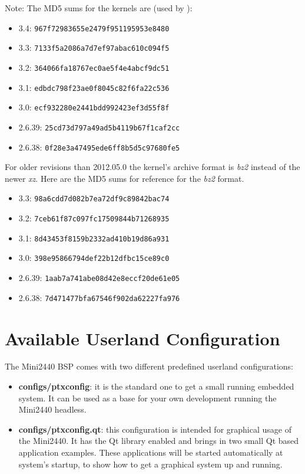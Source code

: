 Note: The MD5 sums for the kernels are (used by \ptxdist{}):
\begin{itemize}
	\item 3.4: \texttt{967f72983655e2479f951195953e8480}
	\item 3.3: \texttt{7133f5a2086a7d7ef97abac610c094f5}
	\item 3.2: \texttt{364066fa18767ec0ae5f4e4abcf9dc51}
	\item 3.1: \texttt{edbdc798f23ae0f8045c82f6fa22c536}
	\item 3.0: \texttt{ecf932280e2441bdd992423ef3d55f8f}
	\item 2.6.39: \texttt{25cd73d797a49ad5b4119b67f1caf2cc}
	\item 2.6.38: \texttt{0f28e3a47495ede6ff8b5d5c97680fe5}
\end{itemize}

For older \ptxdist{} revisions than 2012.05.0 the kernel's archive format
is \textit{bz2} instead of the newer \textit{xz}. Here are the MD5 sums
for reference for the \textit{bz2} format.

\begin{itemize}
	\item 3.3: \texttt{98a6cdd7d082b7ea72df9c89842bac74}
	\item 3.2: \texttt{7ceb61f87c097fc17509844b71268935}
	\item 3.1: \texttt{8d43453f8159b2332ad410b19d86a931}
	\item 3.0: \texttt{398e95866794def22b12dfbc15ce89c0}
	\item 2.6.39: \texttt{1aab7a741abe08d42e8eccf20de61e05}
	\item 2.6.38: \texttt{7d471477bfa67546f902da62227fa976}
\end{itemize}


\section{Available Userland Configuration}	\label{sec:userland}

The Mini2440 BSP comes with two different predefined userland configurations:

\begin{itemize}
	\item \textbf{configs/ptxconfig}: it is the standard one to get a small
	running embedded system. It can be used as a base for your own
	development running the Mini2440 headless.
	\item \textbf{configs/ptxconfig.qt}: this configuration is intended for
	graphical usage of the Mini2440. It has the Qt library enabled and brings
	in two small Qt based application examples. These applications will be
	started automatically at system's startup, to show how to get a
	graphical system up and running.
\end{itemize}

